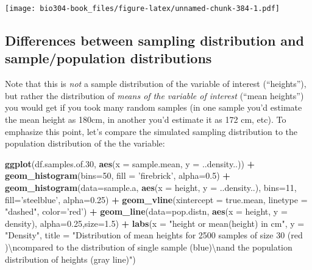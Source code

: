 \documentclass[]{book}
\newenvironment{Shaded}{\begin{snugshade}}{\end{snugshade}}
\newcommand{\CharTok}[1]{\textcolor[rgb]{0.31,0.60,0.02}{#1}}
\newcommand{\DataTypeTok}[1]{\textcolor[rgb]{0.13,0.29,0.53}{#1}}
\newcommand{\DecValTok}[1]{\textcolor[rgb]{0.00,0.00,0.81}{#1}}
\newcommand{\FloatTok}[1]{\textcolor[rgb]{0.00,0.00,0.81}{#1}}
\newcommand{\KeywordTok}[1]{\textcolor[rgb]{0.13,0.29,0.53}{\textbf{#1}}}
\newcommand{\NormalTok}[1]{#1}
\newcommand{\OperatorTok}[1]{\textcolor[rgb]{0.81,0.36,0.00}{\textbf{#1}}}
\newcommand{\StringTok}[1]{\textcolor[rgb]{0.31,0.60,0.02}{#1}}
\theoremstyle{definition}
\theoremstyle{definition}
\theoremstyle{definition}
\theoremstyle{remark}
\begin{document}
\texttt{[image: bio304-book\_files/figure-latex/unnamed-chunk-384-1.pdf]}

\hypertarget{differences-between-sampling-distribution-and-samplepopulation-distributions}{%
\subsection{Differences between sampling distribution and
sample/population
distributions}\label{differences-between-sampling-distribution-and-samplepopulation-distributions}}

Note that this is \emph{not} a sample distribution of the variable of
interest (``heights''), but rather the distribution of \emph{means of
the variable of interest} (``mean heights'') you would get if you took
many random samples (in one sample you'd estimate the mean height as
180cm, in another you'd estimate it as 172 cm, etc). To emphasize this
point, let's compare the simulated sampling distribution to the
population distribution of the the variable:

\begin{Shaded}
\begin{Highlighting}[]
\KeywordTok{ggplot}\NormalTok{(df.samples.of}\FloatTok{.30}\NormalTok{, }\KeywordTok{aes}\NormalTok{(}\DataTypeTok{x =}\NormalTok{ sample.mean, }\DataTypeTok{y =}\NormalTok{ ..density..)) }\OperatorTok{+}
\StringTok{  }\KeywordTok{geom_histogram}\NormalTok{(}\DataTypeTok{bins=}\DecValTok{50}\NormalTok{, }\DataTypeTok{fill =} \StringTok{'firebrick'}\NormalTok{, }\DataTypeTok{alpha=}\FloatTok{0.5}\NormalTok{) }\OperatorTok{+}\StringTok{ }
\StringTok{  }\KeywordTok{geom_histogram}\NormalTok{(}\DataTypeTok{data=}\NormalTok{sample.a, }
                 \KeywordTok{aes}\NormalTok{(}\DataTypeTok{x =}\NormalTok{ height, }\DataTypeTok{y =}\NormalTok{ ..density..),}
                 \DataTypeTok{bins=}\DecValTok{11}\NormalTok{, }\DataTypeTok{fill=}\StringTok{'steelblue'}\NormalTok{, }\DataTypeTok{alpha=}\FloatTok{0.25}\NormalTok{) }\OperatorTok{+}
\StringTok{  }\KeywordTok{geom_vline}\NormalTok{(}\DataTypeTok{xintercept =}\NormalTok{ true.mean, }\DataTypeTok{linetype =} \StringTok{"dashed"}\NormalTok{, }\DataTypeTok{color=}\StringTok{'red'}\NormalTok{) }\OperatorTok{+}\StringTok{ }
\StringTok{  }\KeywordTok{geom_line}\NormalTok{(}\DataTypeTok{data=}\NormalTok{pop.distn, }\KeywordTok{aes}\NormalTok{(}\DataTypeTok{x =}\NormalTok{ height, }\DataTypeTok{y =}\NormalTok{ density), }\DataTypeTok{alpha=}\FloatTok{0.25}\NormalTok{,}\DataTypeTok{size=}\FloatTok{1.5}\NormalTok{) }\OperatorTok{+}\StringTok{   }
\StringTok{  }\KeywordTok{labs}\NormalTok{(}\DataTypeTok{x =} \StringTok{"height or mean(height) in cm"}\NormalTok{, }\DataTypeTok{y  =} \StringTok{"Density"}\NormalTok{,}
       \DataTypeTok{title =} \StringTok{"Distribution of mean heights for 2500 samples of size 30 (red )}\CharTok{\textbackslash{}n}\StringTok{compared to the distribution of  single sample (blue)}\CharTok{\textbackslash{}n}\StringTok{and the population distribution of heights (gray line)"}\NormalTok{)}
\end{Highlighting}
\end{Shaded}
\end{document}
